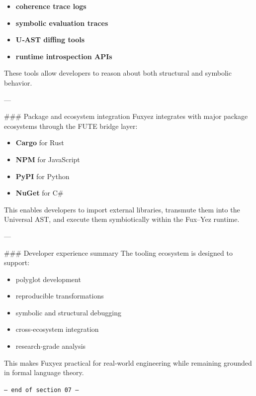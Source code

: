 \begin{enumerate}
\begin{itemize}
  \item \textbf{coherence trace logs}  
  \item \textbf{symbolic evaluation traces}  
  \item \textbf{U‑AST diffing tools}  
  \item \textbf{runtime introspection APIs}  
\end{itemize}

These tools allow developers to reason about both structural and symbolic behavior.

---

\#\#\# Package and ecosystem integration  
Fuxyez integrates with major package ecosystems through the FUTE bridge layer:

\begin{itemize}
  \item \textbf{Cargo} for Rust  
  \item \textbf{NPM} for JavaScript  
  \item \textbf{PyPI} for Python  
  \item \textbf{NuGet} for C\#  
\end{itemize}

This enables developers to import external libraries, transmute them into the Universal AST, and execute them symbiotically within the Fux–Yez runtime.

---

\#\#\# Developer experience summary  
The tooling ecosystem is designed to support:

\begin{itemize}
  \item polyglot development  
  \item reproducible transformations  
  \item symbolic and structural debugging  
  \item cross‑ecosystem integration  
  \item research‑grade analysis  
\end{itemize}

This makes Fuxyez practical for real-world engineering while remaining grounded in formal language theory.
    
    \vspace{1cm}
    \begin{center}
    \color{alienPurple}\texttt{--- end of section 07 ---}
    \end{center}
    \clearpage
    


\end{enumerate}
